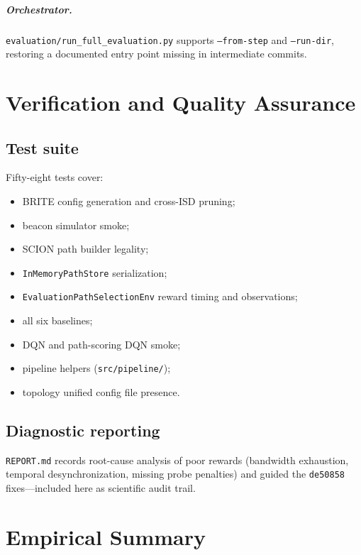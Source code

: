 \documentclass[11pt,a4paper,twoside,openright]{report}
\begin{document}
\paragraph{Orchestrator.}
\texttt{evaluation/run\_full\_evaluation.py} supports \texttt{--from-step} and
\texttt{--run-dir}, restoring a documented entry point missing in intermediate commits.

\chapter{Verification and Quality Assurance}

\section{Test suite}

Fifty-eight tests cover:
\begin{itemize}
  \item BRITE config generation and cross-ISD pruning;
  \item beacon simulator smoke;
  \item SCION path builder legality;
  \item \texttt{InMemoryPathStore} serialization;
  \item \texttt{EvaluationPathSelectionEnv} reward timing and observations;
  \item all six baselines;
  \item DQN and path-scoring DQN smoke;
  \item pipeline helpers (\texttt{src/pipeline/});
  \item topology unified config file presence.
\end{itemize}

\section{Diagnostic reporting}

\texttt{REPORT.md} records root-cause analysis of poor rewards (bandwidth exhaustion,
temporal desynchronization, missing probe penalties) and guided the \texttt{de50858}
fixes---included here as scientific audit trail.

\chapter{Empirical Summary}
\end{document}
